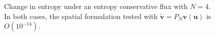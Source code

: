 \documentclass[compress]{beamer}
\newcommand{\logLogSlopeTriangleFlip}[5]
{

    \pgfplotsextra
    {
        \pgfkeysgetvalue{/pgfplots/xmin}{\xmin}
        \pgfkeysgetvalue{/pgfplots/xmax}{\xmax}
        \pgfkeysgetvalue{/pgfplots/ymin}{\ymin}
        \pgfkeysgetvalue{/pgfplots/ymax}{\ymax}

        \pgfmathsetmacro{\xBrel}{#1-#2}
        \pgfmathsetmacro{\yBrel}{#3}
        \pgfmathsetmacro{\xCrel}{#1}

        \pgfmathsetmacro{\lnxB}{\xmin*(1-(#1-#2))+\xmax*(#1-#2)} %
        \pgfmathsetmacro{\lnxA}{\xmin*(1-#1)+\xmax*#1} %
        \pgfmathsetmacro{\lnyA}{\ymin*(1-#3)+\ymax*#3} %
        \pgfmathsetmacro{\lnyC}{\lnyA+#4*(\lnxA-\lnxB)}
        \pgfmathsetmacro{\yCrel}{\lnyC-\ymin)/(\ymax-\ymin)} %

        \pgfmathsetmacro{\xArel}{\xBrel}
        \pgfmathsetmacro{\yArel}{\yCrel}

        \coordinate (A) at (rel axis cs:\xArel,\yArel);
        \coordinate (B) at (rel axis cs:\xBrel,\yBrel);
        \coordinate (C) at (rel axis cs:\xCrel,\yCrel);

        \draw[#5]   (A)-- node[pos=0.5,anchor=east] {#4}
                    (B)-- 
                    (C)-- %
                    cycle;
    }
}
\theoremstyle{plain}
\renewcommand{\tilde}{\widetilde}
\newcommand{\LRp}[1]{\left( #1 \right)}
\begin{document}
{\begin{figure}
{
}
%
%
%
\caption{Change in entropy under an entropy conservative flux with $N=4$.  In both cases, the spatial formulation tested with $\tilde{\bm{v}} = P_N\bm{v}(\bm{u})$ is $O\LRp{10^{-14}}$. }
\end{figure}
}



{\scriptsize

}
\end{document}
